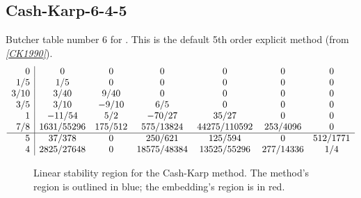 \documentclass[letterpaper,10pt,english]{sphinxmanual}
\begin{document}
\subsection{Cash-Karp-6-4-5}
\label{Butcher:cash-karp-6-4-5}\label{Butcher:butcher-cash-karp}
Butcher table number 6
for {\hyperref[c_interface/User_callable:c.ARKodeSetERKTableNum]{\emph{}}}.  This is
the default 5th order explicit method (from \label{Butcher:id6}{\hyperref[References:ck1990]{\emph{{[}CK1990{]}}}}).
\begin{gather}
\begin{split}\begin{array}{r|cccccc}
  0 & 0 & 0 & 0 & 0 & 0 & 0 \\
  1/5 & 1/5 & 0 & 0 & 0 & 0 & 0 \\
  3/10 & 3/40 & 9/40 & 0 & 0 & 0 & 0 \\
  3/5 & 3/10 & -9/10 & 6/5 & 0 & 0 & 0 \\
  1 & -11/54 & 5/2 & -70/27 & 35/27 & 0 & 0 \\
  7/8 & 1631/55296 & 175/512 & 575/13824 & 44275/110592 & 253/4096 & 0 \\
  \hline
  5 & 37/378 & 0 & 250/621 & 125/594 & 0 & 512/1771 \\
  4 & 2825/27648 & 0 & 18575/48384 & 13525/55296 & 277/14336 & 1/4
\end{array}\end{split}\notag
\end{gather}\begin{figure}[htbp]
\centering
\capstart

\caption{Linear stability region for the Cash-Karp method.  The method's
region is outlined in blue; the embedding's region is in red.}\end{figure}
\end{document}
